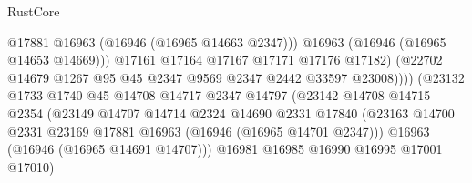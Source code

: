 \begin{lexlean}{RustCore}
\begin{coremodule}
                                            @17881
                                            @16963
                                            (@16946 (@16965 @14663 @2347)))
                                          @16963
                                          (@16946 (@16965 @14653 @14669)))
                                        @17161
                                        @17164
                                        @17167
                                        @17171
                                        @17176
                                        @17182)
                                      (@22702
                                        @14679
                                        @1267
                                        @95
                                        @45
                                        @2347
                                        @9569
                                        @2347
                                        @2442
                                        @33597
                                        @23008))))
                                (@23132
                                  @1733
                                  @1740
                                  @45
                                  @14708
                                  @14717
                                  @2347
                                  @14797
                                  (@23142
                                    @14708
                                    @14715
                                    @2354
                                    (@23149
                                      @14707
                                      @14714
                                      @2324
                                      @14690
                                      @2331
                                      @17840
                                      (@23163
                                        @14700
                                        @2331
                                        @23169
                                        @17881
                                        @16963
                                        (@16946 (@16965 @14701 @2347)))
                                      @16963
                                      (@16946 (@16965 @14691 @14707)))
                                    @16981
                                    @16985
                                    @16990
                                    @16995
                                    @17001
                                    @17010)

\end{coremodule}
\end{lexlean}

